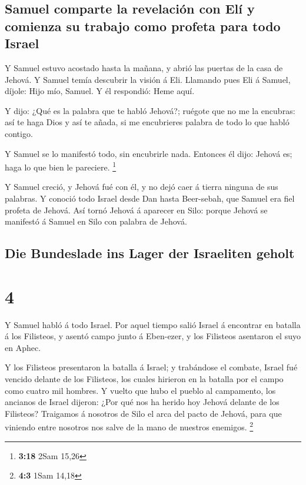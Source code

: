 \hypertarget{samuel-comparte-la-revelaciuxf3n-con-eluxed-y-comienza-su-trabajo-como-profeta-para-todo-israel}{%
\subsection{Samuel comparte la revelación con Elí y comienza su trabajo
como profeta para todo
Israel}\label{samuel-comparte-la-revelaciuxf3n-con-eluxed-y-comienza-su-trabajo-como-profeta-para-todo-israel}}

 Y Samuel estuvo acostado hasta la mañana, y abrió las
puertas de la casa de Jehová. Y Samuel temía descubrir la visión á Eli.
 Llamando pues Eli á Samuel, díjole: Hijo mío, Samuel. Y
él respondió: Heme aquí.

 Y dijo: ¿Qué es la palabra que te habló Jehová?; ruégote
que no me la encubras: así te haga Dios y así te añada, si me
encubrieres palabra de todo lo que habló contigo.

 Y Samuel se lo manifestó todo, sin encubrirle nada.
Entonces él dijo: Jehová es; haga lo que bien le pareciere. \footnote{\textbf{3:18}
  2Sam 15,26}

 Y Samuel creció, y Jehová fué con él, y no dejó caer á
tierra ninguna de sus palabras.  Y conoció todo Israel
desde Dan hasta Beer-sebah, que Samuel era fiel profeta de Jehová.
 Así tornó Jehová á aparecer en Silo: porque Jehová se
manifestó á Samuel en Silo con palabra de Jehová.

\hypertarget{die-bundeslade-ins-lager-der-israeliten-geholt}{%
\subsection{Die Bundeslade ins Lager der Israeliten
geholt}\label{die-bundeslade-ins-lager-der-israeliten-geholt}}

\hypertarget{section-3}{%
\section{4}\label{section-3}}

 Y Samuel habló á todo Israel. Por aquel tiempo salió
Israel á encontrar en batalla á los Filisteos, y asentó campo junto á
Eben-ezer, y los Filisteos asentaron el suyo en Aphec.

 Y los Filisteos presentaron la batalla á Israel; y
trabándose el combate, Israel fué vencido delante de los Filisteos, los
cuales hirieron en la batalla por el campo como cuatro mil hombres.
 Y vuelto que hubo el pueblo al campamento, los ancianos
de Israel dijeron: ¿Por qué nos ha herido hoy Jehová delante de los
Filisteos? Traigamos á nosotros de Silo el arca del pacto de Jehová,
para que viniendo entre nosotros nos salve de la mano de nuestros
enemigos. \footnote{\textbf{4:3} 1Sam 14,18}

